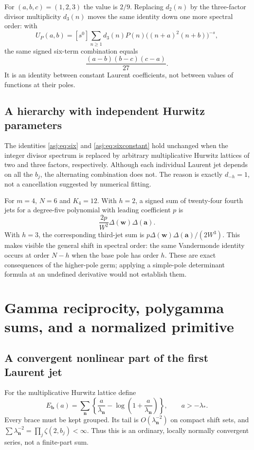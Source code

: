 \documentclass[11pt]{article}
\numberwithin{equation}{section}
\theoremstyle{definition}\newtheorem{definition}[theorem]{Definition}
\theoremstyle{remark}\newtheorem{remark}[theorem]{Remark}\newtheorem{example}[theorem]{Example}
\begin{document}
For $(a,b,c)=(1,2,3)$ the value is $2/9$. Replacing $d_2(n)$ by the
three-factor divisor multiplicity $d_3(n)$ moves the same identity down
one more spectral order: with
\[
 U_P(a,b)=[s^0]\sum_{n\ge1}d_3(n)P(n)
                  \bigl((n+a)^2(n+b)\bigr)^{-s},
\]
the same signed six-term combination equals
\begin{equation}\label{asj:eq:sixconstant}
 \frac{(a-b)(b-c)(c-a)}{27}.
\end{equation}
It is an identity between constant Laurent coefficients, not between
values of functions at their poles.

\subsection{A hierarchy with independent Hurwitz parameters}
The identities \eqref{asj:eq:six} and \eqref{asj:eq:sixconstant} hold unchanged
when the integer divisor spectrum is replaced by arbitrary multiplicative
Hurwitz lattices of two and three factors, respectively. Although each
individual Laurent jet depends on all the $b_j$, the alternating
combination does not. The reason is exactly $d_{-h}=1$, not a cancellation
suggested by numerical fitting.

For $m=4$, $N=6$ and $K_4=12$. With $h=2$, a signed sum of twenty-four
fourth jets for a degree-five polynomial with leading coefficient $p$
is
\[
 \frac{2p}{W^2}\Delta(\boldsymbol w)\Delta(\boldsymbol a).
\]
With $h=3$, the corresponding third-jet sum is
$p\Delta(\boldsymbol w)\Delta(\boldsymbol a)/(2W^3)$.
This makes visible the general shift in spectral order: the same
Vandermonde identity occurs at order $N-h$ when the base pole has order
$h$. These are exact consequences of the higher-pole germ; applying a
simple-pole determinant formula at an undefined derivative would not
establish them.



\section{Gamma reciprocity, polygamma sums, and a normalized primitive}
\label{asj:sec:gamma}

\subsection{A convergent nonlinear part of the first Laurent jet}
For the multiplicative Hurwitz lattice define
\begin{equation}\label{asj:eq:Edef}
 E_{\boldsymbol b}(a)=\sum_{\boldsymbol n}
        \left\{\frac a{\lambda_{\boldsymbol n}}
                    -\log\left(1+\frac a{\lambda_{\boldsymbol n}}\right)\right\},
 \qquad a> -\lambda_*.
\end{equation}
Every brace must be kept grouped. Its tail is $O(\lambda_{\boldsymbol n}^{-2})$
on compact shift sets, and $\sum\lambda_{\boldsymbol n}^{-2}
=\prod_j\zeta(2,b_j)<\infty$. Thus this is an ordinary, locally normally
convergent series, not a finite-part sum.
\end{document}
